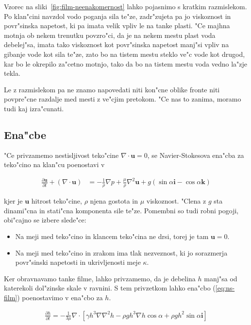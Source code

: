 \documentclass[a4paper,10pt]{article}
\renewcommand{\vec}{\mathbf}
\begin{document}
Vzorec na sliki~\ref{fig:film-neenakomernost} lahko pojasnimo s kratkim razmislekom. Po klan"cini navzdol vodo poganja sila te"ze, zadr"zujeta pa jo viskoznost in povr"sinska napetost, ki pa imata velik vpliv le na tanke plasti. "Ce majhna motnja ob nekem trenutku povzro"ci, da je na nekem mestu plast voda debelej"sa, imata tako viskoznost kot povr"sinska napetost manj"si vpliv na gibanje vode kot sila te"ze, zato bo na tistem mestu steklo ve"c vode kot drugod, kar bo le okrepilo za"cetno motnjo, tako da bo na tistem mestu voda vedno la"zje tekla. 

Le z razmislekom pa ne znamo napovedati niti kon"cne oblike fronte niti povpre"cne razdalje med mesti z ve"cjim pretokom. "Ce nas to zanima, moramo tudi kaj izra"cunati. 

\subsection{Ena"cbe}

"Ce privzamemo nestisljivost teko"cine $\nabla \cdot \vec u = 0$, se Navier-Stokesova ena"cba za teko"cino na klan"cu poenostavi v 

\begin{align}
 \label{eq:ns-film}
 \frac{\partial \vec u}{\partial t} + (\nabla \cdot \vec u) &= -\frac{1}{\rho}\nabla p + \frac{\mu}{\rho}\nabla^2 \vec u + g (\sin \alpha \vec i - \cos \alpha \vec k)
\end{align}

kjer je $\vec u$ hitrost teko"cine, $\rho$ njena gostota in $\mu$ viskoznost. "Clena z $g$ sta dinami"cna in stati"cna komponenta sile te"ze. Pomembni so tudi robni pogoji, obi"cajno se izbere slede"ce:

\begin{itemize}
 \item Na meji med teko"cino in klancem teko"cina ne drsi, torej je tam $\vec u = 0$. 
 \item Na meji med teko"cino in zrakom ima tlak nezveznost, ki jo sorazmerja povr"sinski napetosti in ukrivljenosti meje $\kappa$. 
\end{itemize}

Ker obravnavamo tanke filme, lahko privzamemo, da je debelina $h$ manj"sa od katerekoli dol"zinske skale v ravnini. S tem privzetkom lahko ena"cbo (\ref{eq:ns-film}) poenostavimo v ena"cbo za $h$. 

\begin{align}
\label{eq:ns-film-h}
 \frac{\partial h}{\partial t} = -\frac{1}{3\mu}\nabla \cdot \left[ \gamma h^3 \nabla \nabla^2 h - \rho g h^3 \nabla h \cos \alpha + \rho g h^2 \sin \alpha \vec i \right]
\end{align}
\end{document}
